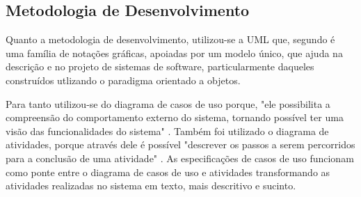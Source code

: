 \subsection{\textbf{Metodologia de Desenvolvimento}}

Quanto a metodologia de desenvolvimento, utilizou-se a UML que, segundo  é uma família de notações gráficas, apoiadas por um modelo único, que ajuda na descrição e no projeto de sistemas de software, particularmente daqueles construídos utlizando o paradigma orientado a objetos.

Para tanto utilizou-se do diagrama de casos de uso porque, "ele possibilita a compreensão do comportamento externo do sistema, tornando possível ter uma visão das funcionalidades do sistema" \cite{guedes18}. Também foi utilizado o diagrama de atividades, porque através dele é possível "descrever os passos a serem percorridos para a conclusão de uma atividade"  \cite{guedes18}. As especificações de casos de uso funcionam como ponte entre o diagrama de casos de uso e atividades transformando as atividades realizadas no sistema em texto, mais descritivo e sucinto.
